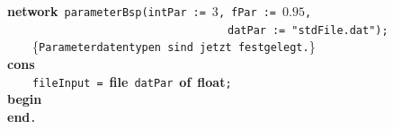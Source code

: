 {\bf network}~\verb&parameterBsp&\verb&(&\verb&intPar&~\verb&:=&~3\verb&,&~\verb&fPar&~\verb&:=&~$0.95$\verb&,&~\\
~~~~~~~~~~~~~~~~~~~~~~~~~~~~~~~~~~~\verb&datPar&~\verb&:=&~\verb&"stdFile.dat"&\verb&)&\verb&;&\\
~~~~{\small \{\verb{Parameterdatentypen sind jetzt festgelegt.{\}}\\[.15cm]
{\bf cons}\\
~~~~\verb&fileInput&~\verb&=&~{\bf file}~\verb&datPar&~{\bf of}~{\bf float}\verb&;&\\[.15cm]
{\bf begin}\\
{\bf end}\verb&.& \\
